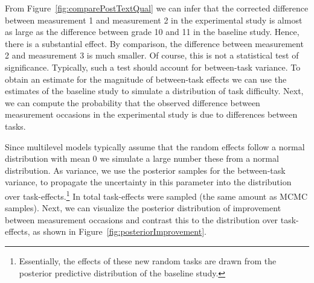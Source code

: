 \documentclass[a4paper]{article}
\newcommand{\getValInt}[3]{%
	\pgfplotstablegetelem{#1}{#2}\of{#3}%
	\pgfmathprintnumber[fixed, fixed zerofill=false]{\pgfplotsretval}%
}
\newcommand{\DON}	[1] 	{}
\begin{document}
From Figure~\ref{fig:comparePostTextQual} we can infer that the corrected difference between measurement 1 and measurement 2 in the experimental study is almost as large as the difference between grade 10 and 11 in the baseline study. Hence, there is a substantial effect. By comparison, the difference between measurement 2 and measurement 3 is much smaller. Of course, this is not a statistical test of significance. Typically, such a test should account for between-task variance. To obtain an estimate for the magnitude of between-task effects we can use the estimates of the baseline study to simulate a distribution of task difficulty. Next, we can compute the probability that the observed difference between measurement occasions in the experimental study is due to differences between tasks.

Since \DON{tot hier gekomen!}multilevel models typically assume that the random effects follow a normal distribution with mean 0 we simulate a large number these from a normal distribution. As variance, we use the posterior samples for the between-task variance, to propagate the uncertainty in this parameter into the distribution over task-effects.\footnote{Essentially, the effects of these new random tasks are drawn from the posterior predictive distribution of the baseline study.} In total \getValInt{0}{total}{\tbMCMCsettings} task-effects were sampled (the same amount as MCMC samples). Next, we can visualize the posterior distribution of improvement between measurement occasions and contrast this to the distribution over task-effects, as shown in Figure~\ref{fig:posteriorImprovement}.
\end{document}
